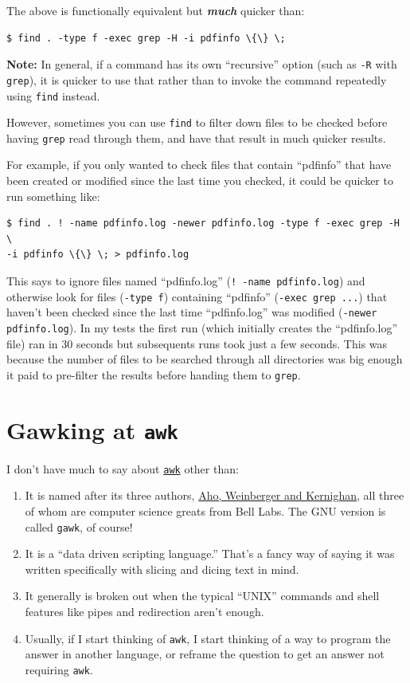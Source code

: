 \documentclass[10pt,]{book}
\numberwithin{figure}{chapter}
\begin{document}
The above is functionally equivalent but \textbf{\emph{much}} quicker
than:

\begin{verbatim}
$ find . -type f -exec grep -H -i pdfinfo \{\} \; 
\end{verbatim}

\textbf{Note:} In general, if a command has its own ``recursive'' option
(such as \texttt{-R} with \texttt{grep}), it is quicker to use that
rather than to invoke the command repeatedly using \texttt{find}
instead.

However, sometimes you can use \texttt{find} to filter down files to be
checked before having \texttt{grep} read through them, and have that
result in much quicker results.

For example, if you only wanted to check files that contain ``pdfinfo''
that have been created or modified since the last time you checked, it
could be quicker to run something like:

\begin{verbatim}
$ find . ! -name pdfinfo.log -newer pdfinfo.log -type f -exec grep -H \
-i pdfinfo \{\} \; > pdfinfo.log
\end{verbatim}

This says to ignore files named ``pdfinfo.log''
(\texttt{! -name pdfinfo.log}) and otherwise look for files
(\texttt{-type f}) containing ``pdfinfo'' (\texttt{-exec grep ...}) that
haven't been checked since the last time ``pdfinfo.log'' was modified
(\texttt{-newer pdfinfo.log}). In my tests the first run (which
initially creates the ``pdfinfo.log'' file) ran in 30 seconds but
subsequents runs took just a few seconds. This was because the number of
files to be searched through all directories was big enough it paid to
pre-filter the results before handing them to \texttt{grep}.

\section{Gawking at \texttt{awk}}\label{gawking-at-awk}

I don't have much to say about
\href{http://linux.die.net/man/1/awk}{\texttt{awk}} other than:

\begin{enumerate}
\def\labelenumi{\arabic{enumi}.}
\item
  It is named after its three authors,
  \href{https://en.wikipedia.org/wiki/AWK}{Aho, Weinberger and
  Kernighan}, all three of whom are computer science greats from Bell
  Labs. The GNU version is called \texttt{gawk}, of course!
\item
  It is a ``data driven scripting language.'' That's a fancy way of
  saying it was written specifically with slicing and dicing text in
  mind.
\item
  It generally is broken out when the typical ``UNIX'' commands and
  shell features like pipes and redirection aren't enough.
\item
  Usually, if I start thinking of \texttt{awk}, I start thinking of a
  way to program the answer in another language, or reframe the question
  to get an answer not requiring \texttt{awk}.
\end{enumerate}
\end{document}
